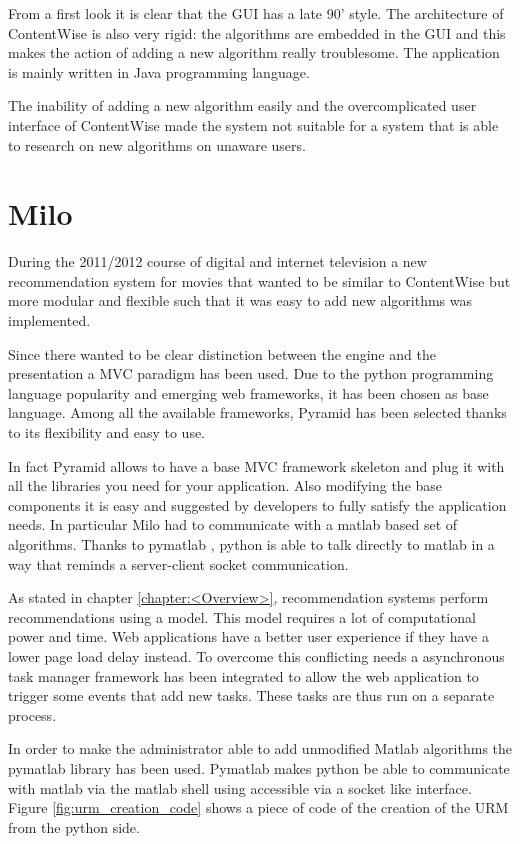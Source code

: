 From a first look it is clear that the \ac{GUI} has a late 90' style. The architecture of ContentWise is also very rigid: the algorithms are embedded in the \ac{GUI} and this makes the action of adding a new algorithm really troublesome.
The application is mainly written in Java programming language.

The inability of adding a new algorithm easily and the overcomplicated user interface of ContentWise made the system not suitable for a system that is able to research on new algorithms on unaware users.

\section{Milo}
\label{sec:milo}

During the 2011/2012 course of digital and internet television a new recommendation system for movies that wanted to be similar to ContentWise but more modular and flexible such that it was easy to add new algorithms was implemented.

Since there wanted to be clear distinction between the engine and the presentation a \ac{MVC} \cite{mvc} paradigm has been used. Due to the python programming language popularity and emerging web frameworks, it has been chosen as base language. Among all the available frameworks, Pyramid \cite{pyramid} has been selected thanks to its flexibility and easy to use.

In fact Pyramid allows to have a base \ac{MVC} framework skeleton and plug it with all the libraries you need for your application. Also modifying the base components it is easy and suggested by developers to fully satisfy the application needs. In particular Milo had to communicate with a matlab \cite{matlab} based set of algorithms. Thanks to pymatlab \cite{pymatlab}, python is able to talk directly to matlab in a way that reminds a server-client socket communication.

As stated in chapter \ref{chapter:<Overview>}, recommendation systems perform recommendations using a model. This model requires a lot of computational power and time. Web applications have a better user experience if they have a lower page load delay instead. To overcome this conflicting needs a asynchronous task manager framework has been integrated to allow the web application to trigger some events that add new tasks. These tasks are thus run on a separate process.

In order to make the administrator able to add unmodified Matlab \cite{matlab} algorithms the pymatlab \cite{pymatlab} library has been used. Pymatlab makes python be able to communicate with matlab via the matlab shell using accessible via a socket like interface. Figure \ref{fig:urm_creation_code} shows a piece of code of the creation of the \ac{URM} from the python side.

